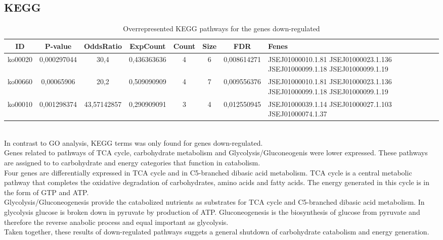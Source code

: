 \documentclass[12pt, a4paper]{report}
\begin{document}
\subsection{KEGG}

\begin{table}[H]
	\centering
	\tiny
	\begin{tabular}{c|c|c|c|c|c|c|p{2cm}}
		\textbf{ID}&\textbf{P-value}&\textbf{OddsRatio}&\textbf{ExpCount}&\textbf{Count}&\textbf{Size}& \textbf{FDR}&\textbf{Fenes}\\
		\hline
ko00020&	0,000297044&	30,4&	0,436363636	&4	&6&	0,008614271	&JSEJ01000010.1.81 JSEJ01000023.1.136 JSEJ01000099.1.18 JSEJ01000099.1.19\\
\hline
ko00660&	0,00065906&	20,2&	0,509090909&	4&	7&	0,009556376	&JSEJ01000010.1.81 JSEJ01000023.1.136 JSEJ01000099.1.18 JSEJ01000099.1.19\\
\hline
ko00010&	0,001298374&	43,57142857&	0,290909091&	3&	4&	0,012550945&JSEJ01000039.1.14 JSEJ01000027.1.103 JSEJ01000074.1.37\\
		\hline
	\end{tabular}
	\caption{Overrepresented KEGG pathways for the genes down-regulated}
\end{table}
\ \\
In contrast to GO analysis, KEGG terms was only found for genes down-regulated. \\
Genes related to pathways of TCA cycle, carbohydrate metabolism and Glycolysis/Gluconeogenis were lower expressed. These pathways are assigned to to carbohydrate and energy categories that function in catabolism.\\
Four genes are differentially expressed in TCA cycle and in C5-branched dibasic acid metabolism. TCA cycle is a central metabolic pathway that completes the oxidative degradation of carbohydrates, amino acids and fatty acids. The energy generated in this cycle is in the form of GTP and ATP. \\
Glycolysis/Gluconeogenesis provide the catabolized nutrients as substrates for TCA cycle and C5-branched dibasic acid metabolism. In glycolysis glucose is broken down in pyruvate by production of ATP. Gluconeogenesis is the biosynthesis of glucose from pyruvate and therefore the reverse anabolic process and equal important as glycolysis. \\
Taken together, these results of down-regulated pathways suggets a general shutdown of carbohydrate catabolism and energy generation.
\end{document}
